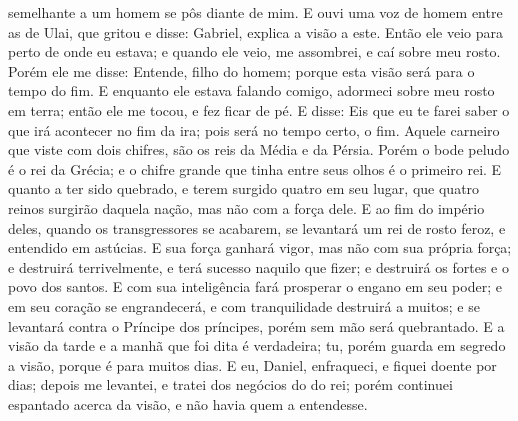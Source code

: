 {{} semelhante a um homem se pôs diante de mim.
E ouvi uma voz de homem entre as
{} de Ulai, que gritou e disse: Gabriel, explica a visão a este.
Então ele veio para perto de onde eu estava; e quando ele veio, me assombrei, e caí sobre meu rosto. Porém ele me disse: Entende, filho do homem; porque esta visão será para o tempo do fim.
E enquanto ele estava falando comigo, adormeci sobre meu rosto em terra; então ele me tocou, e fez ficar de pé.
E disse: Eis que eu te farei saber o que irá acontecer no fim da ira; pois será no tempo certo, o fim.
Aquele carneiro que viste com dois chifres, são os reis da Média e da Pérsia.
Porém o bode peludo é o rei da Grécia; e o chifre grande que tinha entre seus olhos é o primeiro rei.
E quanto a ter sido quebrado, e terem surgido quatro em seu lugar,
{} que quatro reinos surgirão daquela nação, mas não com a força dele.
E ao fim do império deles, quando os transgressores se acabarem, se levantará um rei de rosto feroz, e entendido em astúcias.
E sua força ganhará vigor, mas não com sua própria força; e destruirá terrivelmente, e terá sucesso naquilo que fizer; e destruirá os fortes e o povo dos santos.
E com sua inteligência fará prosperar o engano em seu poder;
 e em seu coração se engrandecerá, e com tranquilidade destruirá a muitos; e se levantará contra o Príncipe dos príncipes, porém sem mão será quebrantado.
E a visão da tarde e a manhã que foi dita é verdadeira; tu, porém guarda em segredo
 a visão, porque é para muitos dias.
E eu, Daniel, enfraqueci, e fiquei doente por
{} dias; depois me levantei, e tratei dos negócios do do rei; porém continuei espantado acerca da visão, e não havia quem a entendesse.

\par }

